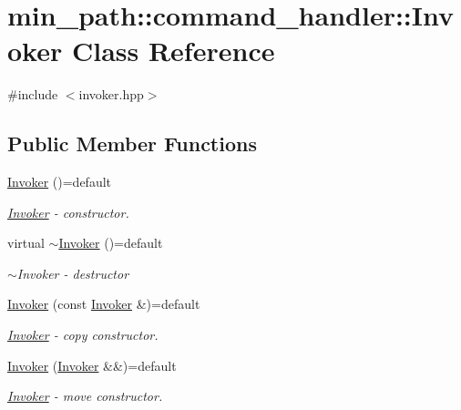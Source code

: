 \hypertarget{classmin__path_1_1command__handler_1_1_invoker}{}\section{min\+\_\+path\+:\+:command\+\_\+handler\+:\+:Invoker Class Reference}
\label{classmin__path_1_1command__handler_1_1_invoker}


{\ttfamily \#include $<$invoker.\+hpp$>$}

\subsection*{Public Member Functions}
\begin{DoxyCompactItemize}
\item 
\hyperlink{classmin__path_1_1command__handler_1_1_invoker_a6e5e462211d17404ba6d656bec647d7c}{Invoker} ()=default
\begin{DoxyCompactList}\small\item\em \hyperlink{classmin__path_1_1command__handler_1_1_invoker}{Invoker} -\/ constructor. \end{DoxyCompactList}\item 
virtual \hyperlink{classmin__path_1_1command__handler_1_1_invoker_a76fd06a765d40c6179dfa0cab5cbd978}{$\sim$\+Invoker} ()=default
\begin{DoxyCompactList}\small\item\em $\sim$\+Invoker -\/ destructor \end{DoxyCompactList}\item 
\hyperlink{classmin__path_1_1command__handler_1_1_invoker_a2055f499946cba7327b5c3632061d1ce}{Invoker} (const \hyperlink{classmin__path_1_1command__handler_1_1_invoker}{Invoker} \&)=default
\begin{DoxyCompactList}\small\item\em \hyperlink{classmin__path_1_1command__handler_1_1_invoker}{Invoker} -\/ copy constructor. \end{DoxyCompactList}\item 
\hyperlink{classmin__path_1_1command__handler_1_1_invoker_a4e3d12bafbf74728a2aee31361be4fb0}{Invoker} (\hyperlink{classmin__path_1_1command__handler_1_1_invoker}{Invoker} \&\&)=default
\begin{DoxyCompactList}\small\item\em \hyperlink{classmin__path_1_1command__handler_1_1_invoker}{Invoker} -\/ move constructor. \end{DoxyCompactList}\item 

\end{DoxyCompactItemize}
